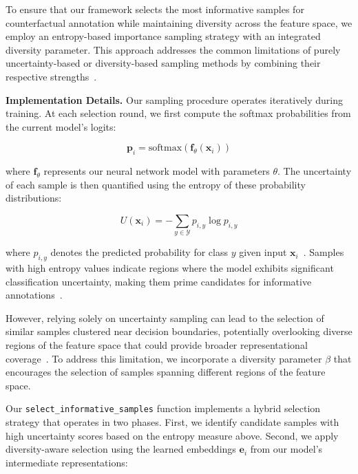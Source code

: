 \documentclass[sigconf,anonymous]{aamas}
\begin{document}
To ensure that our framework selects the most informative samples for counterfactual annotation while maintaining diversity across the feature space, we employ an entropy-based importance sampling strategy with an integrated diversity parameter. This approach addresses the common limitations of purely uncertainty-based or diversity-based sampling methods by combining their respective strengths~\cite{he2014active,doucet2024bridging}.

\textbf{Implementation Details.} Our sampling procedure operates iteratively during training. At each selection round, we first compute the softmax probabilities from the current model's logits:

\begin{equation}
\mathbf{p}_i = \text{softmax}(\mathbf{f}_\theta(\mathbf{x}_i))
\end{equation}

where $\mathbf{f}_\theta$ represents our neural network model with parameters $\theta$. The uncertainty of each sample is then quantified using the entropy of these probability distributions:

\begin{equation}
U(\mathbf{x}_i) = -\sum_{y \in \mathcal{Y}} p_{i,y} \log p_{i,y}
\end{equation}

where $p_{i,y}$ denotes the predicted probability for class $y$ given input $\mathbf{x}_i$~\cite{shannon1948mathematical}. Samples with high entropy values indicate regions where the model exhibits significant classification uncertainty, making them prime candidates for informative annotations~\cite{liang2022active}.

However, relying solely on uncertainty sampling can lead to the selection of similar samples clustered near decision boundaries, potentially overlooking diverse regions of the feature space that could provide broader representational coverage~\cite{settles2009active}. To address this limitation, we incorporate a diversity parameter $\beta$ that encourages the selection of samples spanning different regions of the feature space.

Our \texttt{select\_informative\_samples} function implements a hybrid selection strategy that operates in two phases. First, we identify candidate samples with high uncertainty scores based on the entropy measure above. Second, we apply diversity-aware selection using the learned embeddings $\mathbf{e}_i$ from our model's intermediate representations:
\end{document}

